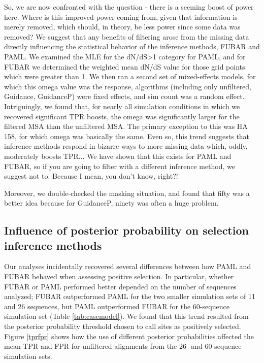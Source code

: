 \documentclass[11pt]{article}
\begin{document}
So, we are now confronted with the question - there is a seeming boost of power here. Where is this improved power coming from, given that information is merely removed, which should, in theory, be less power since some data was removed? We suggest that any benefits of filtering arose from the missing data directly influencing the statistical behavior of the inference methods, FUBAR and PAML. We examined the MLE for the dN/dS>1 category for PAML, and for FUBAR we determined the weighted mean dN/dS value for those grid points which were greater than 1. We then ran a second set of mixed-effects models, for which this omega value was the response, algorithms (including only unfiltered, Guidance, GuidanceP) were fixed effects, and sim count was a random effect. Intriguingly, we found that, for nearly all simulation conditions in which we recovered significant TPR boosts, the omega was significantly larger for the filtered MSA than the unfiltered MSA. The primary exception to this was HA 158, for which omega was basically the same. Even so, this trend suggests that inference methods respond in bizarre ways to more missing data which, oddly, moderately boosts TPR...
We have shown that this exists for PAML and FUBAR, so if you are going to filter with a different inference method, we suggest not to. Because I mean, you don't know, right?!

Moreover, we double-checked the masking situation, and found that fifty was a better idea because for GuidanceP, ninety was often a huge problem.

\subsection*{Influence of posterior probability on selection inference methods}

Our analyses incidentally recovered several differences between how PAML and FUBAR behaved when assessing positive selection. In particular, whether FUBAR or PAML performed better depended on the number of sequences analyzed; FUBAR outperformed PAML for the two smaller simulation sets of 11 and 26 sequences, but PAML outperformed FUBAR for the 60-sequence simulation set (Table \ref{tab:casemodel}). We found that this trend resulted from the posterior probability threshold chosen to call sites as positively selected. Figure \ref{tprfpr} shows how the use of different posterior probabilities affected the mean TPR and FPR for unfiltered alignments from the 26- and 60-sequence simulation sets. 
\end{document}
